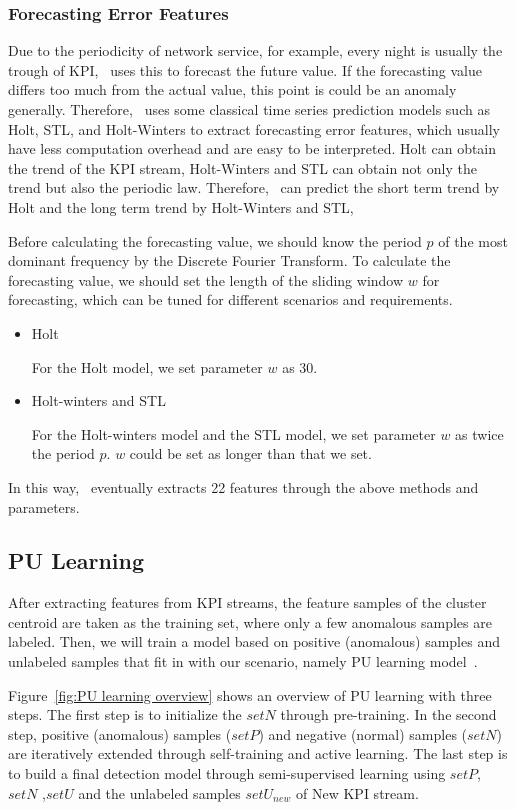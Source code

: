 \subsubsection{Forecasting Error Features}
\label{subsubsubsec:forecasting_error_features}
Due to the periodicity of network service, for example, every night is usually the trough of KPI, \name~uses this to forecast the future value. If the forecasting value differs too much from the actual value, this point is could be an anomaly generally. Therefore, \name~uses some classical time series prediction models such as Holt, STL, and Holt-Winters to extract forecasting error features, which usually have less computation overhead and are easy to be interpreted.
Holt can obtain the trend of the KPI stream, Holt-Winters and STL can obtain not only the trend but also the periodic law. Therefore, \name~can predict the short term trend by Holt and the long term trend by Holt-Winters and STL,
\par Before calculating the forecasting value, we should know the period $p$ of the most dominant frequency by the Discrete Fourier Transform.
To calculate the forecasting value, we should set the length of the sliding window $w$ for forecasting, which can be tuned for different scenarios and requirements.
\begin{itemize}
    \item Holt
    \par
    For the Holt model, we set parameter $w$ as 30.
    \item Holt-winters and STL
    \par
    For the Holt-winters model and the STL model, we set parameter $w$ as twice the period $p$. $w$ could be set as longer than that we set. 
\end{itemize}
In this way, \name~eventually extracts 22 features through the above methods and parameters.
\subsection{PU Learning}
\label{subsubsec:PU learning}
After extracting features from KPI streams, the feature samples of the cluster centroid are taken as the training set, where only a few anomalous samples are labeled. Then, we will train a model based on positive (anomalous) samples and unlabeled samples that fit in with our scenario, namely PU learning model~\cite{PULearning_for_Anomaly_Detection}.
\par
Figure~\ref{fig:PU learning overview} shows an overview of PU learning with three steps. The first step is to initialize the $setN$ through pre-training. In the second step, positive (anomalous) samples ($setP$) and negative (normal) samples ($setN$) are iteratively extended through self-training and active learning. The last step is to build a final detection model through semi-supervised learning using $setP$, $setN$ ,$setU$ and the unlabeled samples $setU_{new}$ of New KPI stream.
\par
